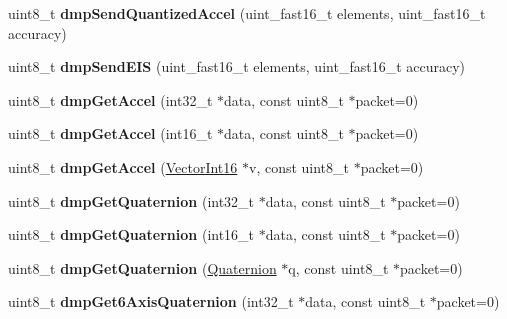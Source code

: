 \begin{DoxyCompactItemize}
\item 
\mbox{\label{classMPU6050_a7383c4681b040cefc31d472362b7aeb2}} 
uint8\+\_\+t {\bfseries dmp\+Send\+Quantized\+Accel} (uint\+\_\+fast16\+\_\+t elements, uint\+\_\+fast16\+\_\+t accuracy)
\item 
\mbox{\label{classMPU6050_a628d208cf85fcf46b3e100880e332e19}} 
uint8\+\_\+t {\bfseries dmp\+Send\+E\+IS} (uint\+\_\+fast16\+\_\+t elements, uint\+\_\+fast16\+\_\+t accuracy)
\item 
\mbox{\label{classMPU6050_a113be793514449548008fe1eae5459ef}} 
uint8\+\_\+t {\bfseries dmp\+Get\+Accel} (int32\+\_\+t $\ast$data, const uint8\+\_\+t $\ast$packet=0)
\item 
\mbox{\label{classMPU6050_a7fdca0e0bf7d8a20818c28d4ed734647}} 
uint8\+\_\+t {\bfseries dmp\+Get\+Accel} (int16\+\_\+t $\ast$data, const uint8\+\_\+t $\ast$packet=0)
\item 
\mbox{\label{classMPU6050_a31018c8a11a8a87725faab59bb948da7}} 
uint8\+\_\+t {\bfseries dmp\+Get\+Accel} (\mbox{\hyperlink{classVectorInt16}{Vector\+Int16}} $\ast$v, const uint8\+\_\+t $\ast$packet=0)
\item 
\mbox{\label{classMPU6050_aac2d2a0de3fd26e37b8341206fc26260}} 
uint8\+\_\+t {\bfseries dmp\+Get\+Quaternion} (int32\+\_\+t $\ast$data, const uint8\+\_\+t $\ast$packet=0)
\item 
\mbox{\label{classMPU6050_a96eacd8075f484bad2376c95b0defb26}} 
uint8\+\_\+t {\bfseries dmp\+Get\+Quaternion} (int16\+\_\+t $\ast$data, const uint8\+\_\+t $\ast$packet=0)
\item 
\mbox{\label{classMPU6050_a712866736969fb002303c55effc627cb}} 
uint8\+\_\+t {\bfseries dmp\+Get\+Quaternion} (\mbox{\hyperlink{classQuaternion}{Quaternion}} $\ast$q, const uint8\+\_\+t $\ast$packet=0)
\item 
\mbox{\label{classMPU6050_a776c9ba67375bfe59432e7f78c7eab87}} 
uint8\+\_\+t {\bfseries dmp\+Get6\+Axis\+Quaternion} (int32\+\_\+t $\ast$data, const uint8\+\_\+t $\ast$packet=0)
\item 

\end{DoxyCompactItemize}
